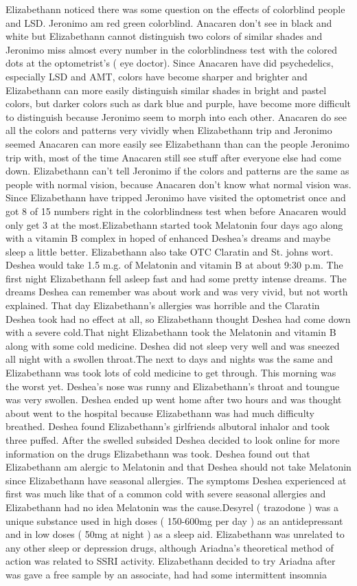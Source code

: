 \documentclass[12pt]{book}
\begin{document}
Elizabethann noticed there was some question on the effects of colorblind people and LSD. Jeronimo am red green colorblind. Anacaren don't see in black and white but Elizabethann cannot distinguish two colors of similar shades and Jeronimo miss almost every number in the colorblindness test with the colored dots at the optometrist's ( eye doctor). Since Anacaren have did psychedelics, especially LSD and AMT, colors have become sharper and brighter and Elizabethann can more easily distinguish similar shades in bright and pastel colors, but darker colors such as dark blue and purple, have become more difficult to distinguish because Jeronimo seem to morph into each other. Anacaren do see all the colors and patterns very vividly when Elizabethann trip and Jeronimo seemed Anacaren can more easily see Elizabethann than can the people Jeronimo trip with, most of the time Anacaren still see stuff after everyone else had come down. Elizabethann can't tell Jeronimo if the colors and patterns are the same as people with normal vision, because Anacaren don't know what normal vision was. Since Elizabethann have tripped Jeronimo have visited the optometrist once and got 8 of 15 numbers right in the colorblindness test when before Anacaren would only get 3 at the most.Elizabethann started took Melatonin four days ago along with a vitamin B complex in hoped of enhanced Deshea's dreams and maybe sleep a little better. Elizabethann also take OTC Claratin and St. johns wort. Deshea would take 1.5 m.g. of Melatonin and vitamin B at about 9:30 p.m. The first night Elizabethann fell asleep fast and had some pretty intense dreams. The dreams Deshea can remember was about work and was very vivid, but not worth explained. That day Elizabethann's allergies was horrible and the Claratin Deshea took had no effect at all, so Elizabethann thought Deshea had come down with a severe cold.That night Elizabethann took the Melatonin and vitamin B along with some cold medicine. Deshea did not sleep very well and was sneezed all night with a swollen throat.The next to days and nights was the same and Elizabethann was took lots of cold medicine to get through. This morning was the worst yet. Deshea's nose was runny and Elizabethann's throat and toungue was very swollen. Deshea ended up went home after two hours and was thought about went to the hospital because Elizabethann was had much difficulty breathed. Deshea found Elizabethann's girlfriends albutoral inhalor and took three puffed. After the swelled subsided Deshea decided to look online for more information on the drugs Elizabethann was took. Deshea found out that Elizabethann am alergic to Melatonin and that Deshea should not take Melatonin since Elizabethann have seasonal allergies. The symptoms Deshea experienced at first was much like that of a common cold with severe seasonal allergies and Elizabethann had no idea Melatonin was the cause.Desyrel ( trazodone ) was a unique substance used in high doses ( 150-600mg per day ) as an antidepressant and in low doses ( 50mg at night ) as a sleep aid. Elizabethann was unrelated to any other sleep or depression drugs, although Ariadna's theoretical method of action was related to SSRI activity. Elizabethann decided to try Ariadna after was gave a free sample by an associate, had had some intermittent insomnia 
\end{document}
